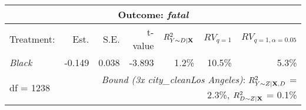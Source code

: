 \begin{table}[!h]
\centering
\begin{tabular}{lrrrrrr}
\multicolumn{7}{c}{Outcome: \textit{fatal}} \\
\hline \hline 
Treatment: & Est. & S.E. & t-value & $R^2_{Y \sim D |{\bf X}}$ & $RV_{q = 1}$ & $RV_{q = 1, \alpha = 0.05}$  \\ 
\hline 
\textit{Black} & -0.149 & 0.038 & -3.893 & 1.2\% & 10.5\% & 5.3\% \\ 
\hline 
df = 1238 & & \multicolumn{5}{r}{ \small \textit{Bound (3x city_cleanLos Angeles)}: $R^2_{Y\sim Z| {\bf X}, D}$ = 2.3\%, $R^2_{D\sim Z| {\bf X} }$ = 0.1\%} \\
\end{tabular}
\end{table}
